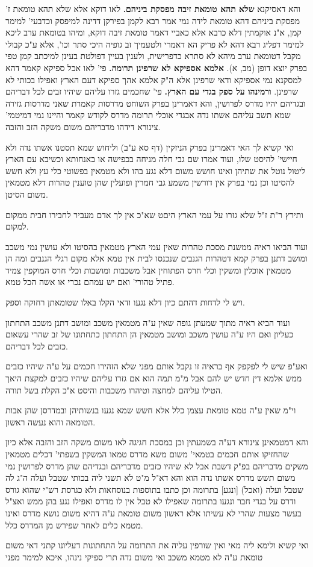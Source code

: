 \documentclass[12pt, openany]{book}
\begin{document}
{ והא דאסיקנא \textbf{שלא תהא טומאת זיבה מפסקת ביניהם.}  לאו דוקא אלא שלא תהא טומאת ז' מפסקת ביניהם דהא טומאת לידה נמי אמר רבא לקמן בפירקן דדינה למיפסק וכדבעי' למימר קמן, א"נ אוקמתין דלא כרבא אלא כאביי דאמר טומאת זיבה דוקא, ומיהו בטומאת ערב ליכא למימר דפליג רבא דהא לא פריק הא דאמרי ולטעמיך זב גופיה היכי סתר וכו', אלא ע"כ קבולי מקבל דטומאת ערב מיהא לא סתרא כדפרישית, ולענין בעיין דפולטת בעינן למיכתב קמן טפי בפרק יוצא דופן (מב, א). 
\textbf{אלמא אספיקא לא שרפינן תרומה.}  פי' לאו אכל ספיקא קאמר דהא למסקנא נמי אספיקא ודאי שרפינן אלא ה"ק אלמא אהך ספיקא דעם הארץ ואפילו בכותי לא שרפינן. 
\textbf{ורמינהו על ספק בגדי עם הארץ.}  פי' שחכמים גזרו עליהם שיהיו זבים לכל דבריהם ובגדיהם יהיו מדרס לפרושין, והא דאמרינן בפרק השוחט מדרסות קאמרת שאני מדרסות גזירה שמא תשב עליהם אשתו נדה אבגדי אוכלי תרומה מדרס לקודש קאמר והיינו נמי דמיטמי' צינורא דידהו מדבריהם משום משקה הזב והזבה.\par ואי קשיא לך האי דאמרינן בפרק הניזקין (דף סא ע"ב) וליחוש שמא תסטנו אשתו נדה ולא חיישי' להיסט שלו, ועוד אמרו שם גבי חלה מניחה בכפישה או באנחותא וכשיבא עם הארץ ליטול נוטל את שתיהן ואינו חושש משום דלא נגע בהו ולא מטמאין בפשוטי כלי עץ ולא חשש להסיטו וכן נמי בפרק אין דורשין משמע גבי חמרין ופועלין שהן טוענין טהרות דלא מטמאין משום הסיטן.\par ותירץ ר"ת ז"ל שלא גזרו על עמי הארץ היםט שא"כ אין לך אדם מעביר לחבירו חבית ממקום למקום.\par ועוד הביאו ראיה ממשנת מסכת טהרות שאין עמי הארץ מטמאין בהסיטו ולא עושין נמי משכב ומושב דתנן בפרק קמא דטהרות הגנבים שנכנסו לבית אין טמא אלא מקום רגלי הגנבים ומה הן מטמאין אוכלין ומשקין וכלי חרס הפתוחין אבל משכבות ומושבות וכלי חרס המוקפין צמיד פתיל טהורי' ואם יש עמהם נכרי או אשה הכל טמא.\par  ויש לי לדחות דהתם כיון דלא נגעו ודאי הקלו באלו שטומאתן רחוקה וספק.\par  ועוד הביא ראיה מתוך שמעתן גופה שאין ע"ה מטמאין משכב ומושב דתנן משכב התחתון כעליון ואם היו ע"ה עושין משכב ומושב מטמאין הן התחתון כתחתונו של זב שהרי עשאום כזבים לכל דבריהם.\par  ואע"פ שיש לי לפקפק אף בראיה זו נקבל אותם מפני שלא הזהירו חכמים על ע"ה שיהיו כזבים ממש אלמא דין חדש יש להם אבל מ"מ תמה הוא אם גזרו עליהם שיהיו כזבים למקצת היאך הטילו עליהם למחצה וטיהרו משכבות והיסט א"כ הקלת בשל תורה.\par וי"מ שאין ע"ה טמא טומאת עצמן כלל אלא חשש שמא נגעו בנשותיהן ובמדרסן שהן אבות הטומאה והוא נעשה ראשון.\par  והא דמטמאינן צינורא דע"ה בשמעתין וכן במסכת חגיגה לאו משום משקה הזב והזבה אלא כיון שהחזיקו אותם חכמים בטמאי' משום משא מדרס טמאו המשקין בשפתי' דכלים מטמאין משקים מדבריהם בפ"ק דשבת אבל לא שיהיו כזבים מדבריהם ובגדיהם שהן מדרס לפרושין נמי משום תשש מדרס אשתו נדה הוא והא דא"ל מ"ט לא תשני ליה בכותי שטבל ועלה ה"ג לה שטבל ועלה (ואכל) [ונגע] בתרומה וכן כתבו בתוספות בנוסחאות ולא כגרסת רש"י שהוא גורס ודרס על בגדי חבר ונגעו בתרומה שאפילו לא טבל אין לו מדרס ואפילו נגע בהן ממש ואצ"ל בעשר מצעות שהרי לא עשיתו אלא ראשון משום טומאת ע"ה דהיא משום נושא מדרס ואינו מטמא כלים לאחר שפירש מן המדרס כלל.\par  ואי קשיא ולימא ליה מאי ואין שורפין עליה את התרומה על התחתונות דעליונו קתני דאי משום טומאת ע"ה לא מטמא משכב ואי משום נדה תרי ספיקי נינהו, איכא למימר מפני }
\end{document}
